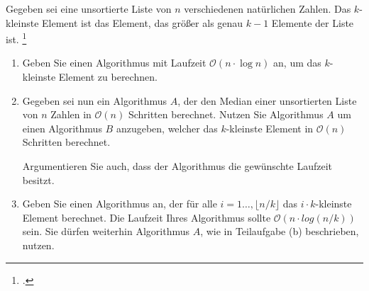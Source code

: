 \documentclass{bschlangaul-aufgabe}
\begin{document}

Gegeben sei eine unsortierte Liste von $n$ verschiedenen natürlichen
Zahlen. Das $k$-kleinste Element ist das Element, das größer als genau
$k - 1$ Elemente der Liste ist.
\footcite{examen:66115:2019:03}

\begin{enumerate}


\item Geben Sie einen Algorithmus mit Laufzeit $\mathcal{O}(n \cdot \log
n)$ an, um das $k$-kleinste Element zu berechnen.

\begin{bAntwort}
\end{bAntwort}


\item Gegeben sei nun ein Algorithmus $A$, der den Median einer
unsortierten Liste von $n$ Zahlen in $\mathcal{O}(n)$ Schritten
berechnet. Nutzen Sie Algorithmus $A$ um einen Algorithmus $B$
anzugeben, welcher das $k$-kleinste Element in $\mathcal{O}(n)$
Schritten berechnet.

Argumentieren Sie auch, dass der Algorithmus die gewünschte Laufzeit
besitzt.

\begin{bAntwort}
\end{bAntwort}


\item  Geben Sie einen Algorithmus an, der für alle $i = 1 \dots,
\lfloor n/k \rfloor$ das $i \cdot k$-kleinste Element berechnet. Die
Laufzeit Ihres Algorithmus sollte $\mathcal{O}(n \cdot log(n/k))$ sein.
Sie dürfen weiterhin Algorithmus $A$, wie in Teilaufgabe (b)
beschrieben, nutzen.

\end{enumerate}
\end{document}
